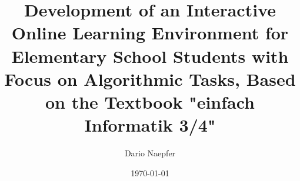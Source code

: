 \documentclass[a4paper, oneside]{thesis}
\title{Development of an Interactive Online Learning Environment for Elementary School Students with Focus on Algorithmic Tasks, Based on the Textbook "einfach Informatik 3/4"}
\author{Dario Naepfer}
\institute{Chair of Information Technology and Education \\[2pt]
ETH Zürich}
\date{\today}
\begin{document}
\frontmatter %
\maketitle

\cleardoublepage

\begin{abstract}
	
\end{abstract}

\begin{acknowledgements}
	
\end{acknowledgements}

{
  \hypersetup{linkcolor=black}
  \tableofcontents
}

\mainmatter %









%
%
%
%







% 
\end{document}
